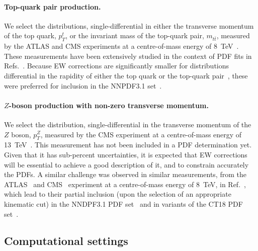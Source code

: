 \paragraph{Top-quark pair production.}
We select the distributions, single-differential in either the transverse
momentum of the top quark, $p_T^t$, or the invariant mass of the top-quark
pair, $m_{t\bar t}$, measured by the ATLAS and CMS experiments at a centre-of-mass
energy of 8~TeV~\cite{Aad:2015mbv,Khachatryan:2015oqa}. These measurements have
been extensively studied in the context of PDF fits in
Refs.~\cite{Czakon:2016olj,Bailey:2019yze,Amoroso:2020lgh,Kadir:2020yml}.
Because EW corrections are significantly smaller for distributions differential
in the rapidity of either the top quark or the top-quark
pair~\cite{Czakon:2017wor}, these were preferred for inclusion in the NNPDF3.1
set~\cite{Ball:2017nwa}.

\paragraph{$Z$-boson production with non-zero transverse momentum.}
We select the distribution, single-differential in the transverse momentum of
the $Z$ boson, $p_T^Z$, measured by the CMS experiment at a centre-of-mass
energy of 13~TeV~\cite{Sirunyan:2019bzr}. This measurement has not been
included in a PDF determination yet. Given that it has sub-percent
uncertainties, it is expected that EW corrections will be essential to
achieve a good description of it, and to constrain accurately the PDFs.
A similar challenge was observed in similar measurements, from the
ATLAS~\cite{Aad:2015auj} and CMS~\cite{Khachatryan:2015oaa} experiment at a
centre-of-mass energy of 8~TeV, in Ref.~\cite{Boughezal:2017nla}, which lead to
their partial inclusion (upon the selection of an appropriate kinematic cut)
in the NNDPF3.1 PDF set~\cite{Ball:2017nwa} and in variants of the CT18 PDF
set~\cite{Hou:2019efy}.

\subsection{Computational settings}
\label{subsec:computational_settings}



